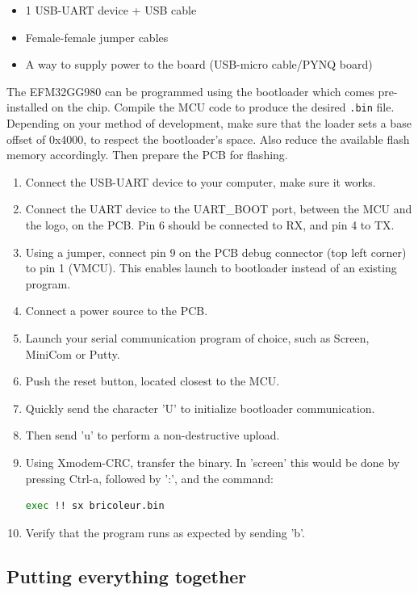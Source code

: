 \begin{itemize}
    \item 1 USB-UART device + USB cable
    \item Female-female jumper cables
    \item A way to supply power to the board (USB-micro cable/PYNQ board)
\end{itemize}

The EFM32GG980 can be programmed using the bootloader which comes pre-installed on the chip. Compile the MCU code to produce the desired \texttt{.bin} file. Depending on your method of development, make sure that the loader sets a base offset of 0x4000, to respect the bootloader's space. Also reduce the available flash memory accordingly. Then prepare the PCB for flashing. 
\begin{enumerate}
    \item Connect the USB-UART device to your computer, make sure it works. 
    \item Connect the UART device to the UART\_BOOT port, between the MCU and the logo, on the PCB. Pin 6 should be connected to RX, and pin 4 to TX.
    \item Using a jumper, connect pin 9 on the PCB debug connector (top left corner) to pin 1 (VMCU). This enables launch to bootloader instead of an existing program.
    \item Connect a power source to the PCB. 
    \item Launch your serial communication program of choice, such as Screen, MiniCom or Putty. 
    \item Push the reset button, located closest to the MCU. 
    \item Quickly send the character 'U' to initialize bootloader communication. 
    \item Then send 'u' to perform a non-destructive upload. 
    \item Using Xmodem-CRC, transfer the binary. In 'screen' this would be done by pressing Ctrl-a, followed by ':', and the command: 
    \lstset{basicstyle=\small}
    \begin{lstlisting}[language=bash]
        exec !! sx bricoleur.bin
    \end{lstlisting}
    \item Verify that the program runs as expected by sending 'b'. 
\end{enumerate}

\subsection{Putting everything together}

